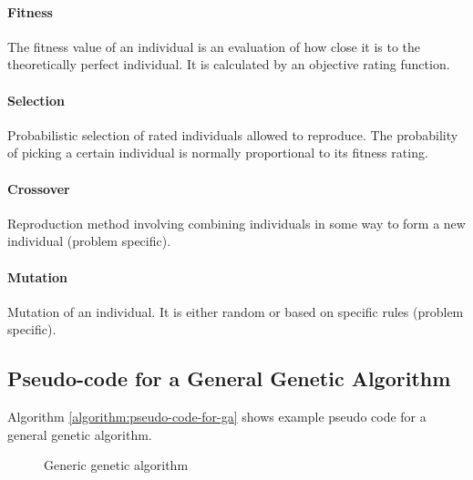 \paragraph{Fitness}
The fitness value of an individual is an evaluation of how close it is to the theoretically perfect individual. It is calculated by an objective rating function.

\paragraph{Selection}
Probabilistic selection of rated individuals allowed to reproduce.
The probability of picking a certain individual is normally proportional to its fitness rating.

\paragraph{Crossover}
Reproduction method involving combining individuals in some way to form a new individual (problem specific). 

\paragraph{Mutation}
Mutation of an individual. It is either random or based on specific rules (problem specific). 

\subsection{Pseudo-code for a General Genetic Algorithm}

Algorithm \vref{algorithm:pseudo-code-for-ga} shows example pseudo code for a general genetic algorithm.

\begin{figure}[H]
\begin{algorithm}[H]
\SetAlgoLined
\DontPrintSemicolon
{}
\caption{Generic genetic algorithm}
\label{algorithm:pseudo-code-for-ga}
\end{algorithm}
\end{figure}

